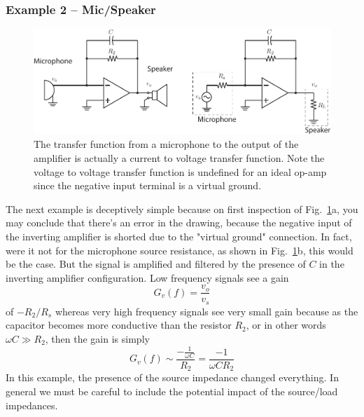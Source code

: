 \subsubsection{Example 2 – Mic/Speaker}
\begin{figure}[tb]
\begin{center}
\includegraphics[width=\columnwidth]{ex_microphone}
\end{center}
\caption{The transfer function from a microphone to the output of the amplifier is actually a current to voltage transfer function.  Note the voltage to voltage transfer function is undefined for an ideal op-amp since the negative input terminal is a virtual ground.}
\label{fig:microphone}
\end{figure}
The next example is deceptively simple because on first inspection of Fig.~\ref{fig:microphone}a, you may conclude that there's an error in the drawing, because the negative input of the inverting amplifier is shorted due to the "virtual ground" connection.  In fact, were it not for the microphone source resistance, as shown in  Fig.~\ref{fig:microphone}b, this would be the case. But the signal is amplified and filtered by the presence of $C$ in the inverting amplifier configuration.  Low frequency signals see a gain 
    \begin{equation}
        G_v(f) = \frac{v_{o}}{v_s }
    \end{equation}
of $-R_2/R_s$ whereas very high frequency signals see very small gain because as the capacitor becomes more conductive than the resistor $R_2$, or in other words $\omega C \gg R_2$, then the gain is simply
    \begin{equation}
        G_v(f) \sim \frac{-\frac{1}{\omega C}}{R_2 } = \frac{-1}{\omega C R_2 }
    \end{equation}
In this example, the presence of the source impedance changed everything.  In general we must be careful to include the potential impact of the source/load impedances.  
